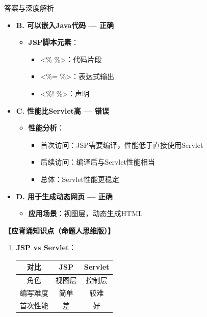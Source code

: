 \documentclass[12pt, a4paper]{ctexart}
\begin{document}
\begin{enumerate}[label=\textbf{\arabic*.}]
\begin{bluebox}{答案与深度解析}
\begin{itemize}[label={}, leftmargin=*, nosep]
		      \item \textbf{B. 可以嵌入Java代码 — 正确}
		      \begin{itemize}[label={}, leftmargin=*, nosep]
			      \item \textbf{JSP脚本元素}：
			            \begin{itemize}[label={}, nosep]
				            \item <\% \%>：代码片段
				            \item <\%= \%>：表达式输出
				            \item <\%! \%>：声明
			            \end{itemize}
		      \end{itemize}

		      \item \textbf{C. 性能比Servlet高 — 错误}
		      \begin{itemize}[label={}, leftmargin=*, nosep]
			      \item \textbf{性能分析}：
			            \begin{itemize}[label={}, nosep]
				            \item 首次访问：JSP需要编译，性能低于直接使用Servlet
				            \item 后续访问：编译后与Servlet性能相当
				            \item 总体：Servlet性能更稳定
			            \end{itemize}
		      \end{itemize}

		      \item \textbf{D. 用于生成动态网页 — 正确}
		      \begin{itemize}[label={}, leftmargin=*, nosep]
			      \item \textbf{应用场景}：视图层，动态生成HTML
		      \end{itemize}

		      \end{itemize}

		      \textbf{【应背诵知识点（命题人思维版）】}
		      \begin{enumerate}[leftmargin=*, nosep]
			      \item \textbf{JSP vs Servlet}：
			            \begin{tabular}{|c|c|c|}
				            \hline
				            \textbf{对比} & \textbf{JSP} & \textbf{Servlet} \\
				            \hline
				            角色          & 视图层          & 控制层              \\
				            \hline
				            编写难度        & 简单           & 较难               \\
				            \hline
				            首次性能        & 差            & 好                \\
				            \hline
			            \end{tabular}


\end{enumerate}
\end{bluebox}
\end{enumerate}
\end{document}
